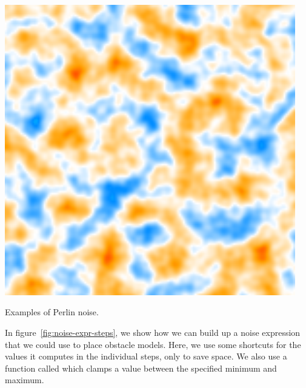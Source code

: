 \begin{center}
\begin{minipage}{.31\textwidth}
        \small{}
    \end{minipage}%
    \begin{minipage}{.31\textwidth}
        \centering
        \includegraphics[width=0.95\textwidth]{img/fractal noise.png}
        \small{}
    \end{minipage}
    \caption{Examples of Perlin noise.}
    \label{fig:noise-funcs}
\end{center}

In figure~\ref{fig:noise-expr-steps}, we show how we can build up a noise expression that we could use to place obstacle models.
Here, we use some shortcuts for the values it computes in the individual steps, only to save space.
We also use a function called  which clamps a value between the specified minimum and maximum.

